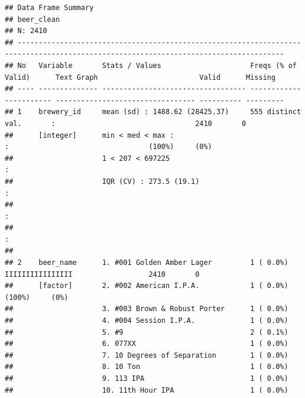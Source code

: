 \documentclass[]{article}
\begin{document}
\begin{verbatim}
## Data Frame Summary   
## beer_clean   
## N: 2410   
## -------------------------------------------------------------------------------------------------------------------------------------
## No   Variable       Stats / Values                     Freqs (% of Valid)      Text Graph                        Valid      Missing  
## ---- -------------- ---------------------------------- ----------------------- --------------------------------- ---------- ---------
## 1    brewery_id     mean (sd) : 1488.62 (28425.37)     555 distinct val.       :                                 2410       0        
##      [integer]      min < med < max :                                          :                                 (100%)     (0%)     
##                     1 < 207 < 697225                                           :                                                     
##                     IQR (CV) : 273.5 (19.1)                                    :                                                     
##                                                                                :                                                     
##                                                                                :                                                     
## 
## 2    beer_name      1. #001 Golden Amber Lager         1 ( 0.0%)               IIIIIIIIIIIIIIII                  2410       0        
##      [factor]       2. #002 American I.P.A.            1 ( 0.0%)                                                 (100%)     (0%)     
##                     3. #003 Brown & Robust Porter      1 ( 0.0%)                                                                     
##                     4. #004 Session I.P.A.             1 ( 0.0%)                                                                     
##                     5. #9                              2 ( 0.1%)                                                                     
##                     6. 077XX                           1 ( 0.0%)                                                                     
##                     7. 10 Degrees of Separation        1 ( 0.0%)                                                                     
##                     8. 10 Ton                          1 ( 0.0%)                                                                     
##                     9. 113 IPA                         1 ( 0.0%)                                                                     
##                     10. 11th Hour IPA                  1 ( 0.0%)                                                                     

\end{verbatim}
\end{document}
